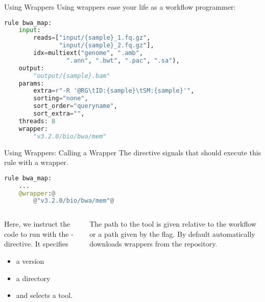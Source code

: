 \begin{frame}[fragile]{Using Wrappers}
    Using \Snakemake{} wrappers ease your life as a workflow programmer:
    \begin{lstlisting}[language=Python,style=Python,basicstyle=\footnotesize]
rule bwa_map:
    input:
        reads=["input/{sample}_1.fq.gz", 
               "input/{sample}_2.fq.gz"],
        idx=multiext("genome", ".amb", 
                 ".ann", ".bwt", ".pac", ".sa"),
    output:
        "output/{sample}.bam"
    params:
        extra=r"-R '@RG\tID:{sample}\tSM:{sample}'",
        sorting="none",  
        sort_order="queryname",  
        sort_extra="", 
    threads: 8
    wrapper:
        "v3.2.0/bio/bwa/mem"
    \end{lstlisting}
\end{frame}

\begin{frame}[fragile]{Using Wrappers: Calling a Wrapper}
	The  directive signals that \Snakemake{} should execute this rule with
	a wrapper.
	\begin{lstlisting}[language=Python,style=Python,basicstyle=\small]
rule bwa_map:
	...
	@wrapper:@
		@"v3.2.0/bio/bwa/mem"@
	\end{lstlisting}
	\begin{docs}
		\begin{columns}
			\begin{column}{0.5\textwidth}
				Here, we instruct the code to run with the -directive.
				It specifies 
				\begin{itemize}
					\item a version
					\item a directory
					\item and selects a tool.
				\end{itemize}
			\end{column}
			\begin{column}{0.5\textwidth}\pause
				The path to the tool is given relative to the workflow or a path given by the 
				flag. By default \Snakemake automatically downloads wrappers from the   repository.
		    \end{column}	
		\end{columns}
	\end{docs}
\end{frame}

